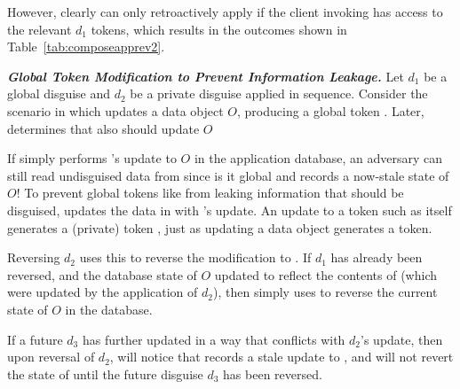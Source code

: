 However, clearly \sys can only retroactively apply  if the client invoking  has
access to the relevant $d_1$ tokens, which results in the outcomes shown in
Table~\ref{tab:composeapprev2}.


\vspace{6pt}\noindent\textbf{\emph{Global Token Modification to Prevent Information Leakage.}}
%
Let $d_1$ be a global disguise and $d_2$ be a private disguise applied in sequence.  Consider the
scenario in which  updates a data object $O$, producing a global token . Later,
\sys determines that  also should update $O$ 

If \sys simply performs 's update to $O$ in the application database, an adversary can still
read undisguised data from  since is it global and records a now-stale state of $O$!
%
%
To prevent global tokens like  from leaking information that should be disguised, \sys
updates the data in  with 's update. An update to a token such as 
itself generates a (private) token , just as updating a data object generates a token.

Reversing $d_2$ uses this  to reverse the modification to . 
If $d_1$ has already been reversed, and the database state of $O$ updated to reflect the contents
of  (which were updated by the application of $d_2$), 
then \sys simply uses  to reverse the current state of $O$ in the database. 

If a future $d_3$ has further updated  in a way that conflicts with $d_2$'s update,
then upon reversal of $d_2$, \sys will notice that  records a stale update to , 
and will not revert
the state of  until the future disguise $d_3$ has been reversed.




